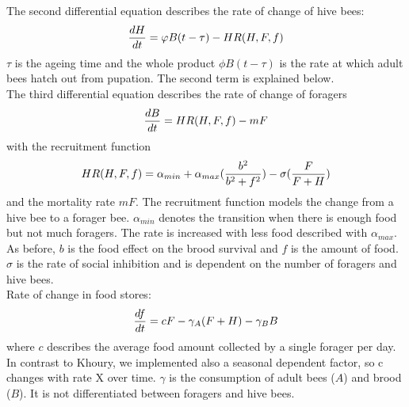 The second differential equation describes the rate of change of hive bees:
\begin{equation}
{dH \over dt}=\phi B(t-\tau)-HR(H,F,f)
\end{equation}
$\tau$ is the ageing time and the whole product $\phi B(t-\tau)$ is the rate at which adult bees hatch out from pupation. The second term is explained below.\\ 
The third differential equation describes the rate of change of foragers  
\begin{equation}\label{Rate of change of foragers}
{dB \over dt} = HR(H,F,f)-m F
\end{equation}
with the recruitment function 
\begin{equation}\label{rate of change of foragers }
HR(H,F,f) = \alpha_{min} + \alpha_{max}({b^2 \over b^2+f^2})-\sigma({F \over F+H})
\end{equation}
and the mortality rate $mF$. The recruitment function models the change from a hive bee to a forager bee. $\alpha_{min}$ denotes the transition when there is enough food but not much foragers. The rate is increased with less food described with $\alpha_{max}$. As before, $b$ is the food effect on the brood survival and $f$ is the amount of food. $\sigma$ is the rate of social inhibition and is dependent on the number of foragers and hive bees.\\
Rate of change in food stores:
\begin{equation}\label{Rate of change in food stores}
{df \over dt} = c F - \gamma_A (F+H) - \gamma_B B
\end{equation}
where $c$ describes the average food amount collected by a single forager per day. In contrast to Khoury, we implemented also a seasonal dependent factor, so c changes with rate X over time. $\gamma$ is the consumption of adult bees ($A$) and brood ($B$). It is not differentiated between foragers and hive bees.  





